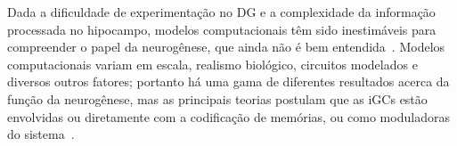 Dada a dificuldade de experimentação no DG e a complexidade da informação processada no hipocampo, modelos computacionais têm sido
inestimáveis para compreender o papel da neurogênese, que ainda não é bem entendida~\cite{aimoneComputational2016}. Modelos
computacionais variam em escala, realismo biológico, circuitos modelados e diversos outros fatores; portanto há uma gama de
diferentes resultados acerca da função da neurogênese, mas as principais teorias postulam que as iGCs estão envolvidas ou
diretamente com a codificação de memórias, ou como moduladoras do sistema~\cite{aimoneComputational2016,
berdugo-vegaSharpening2023}.


